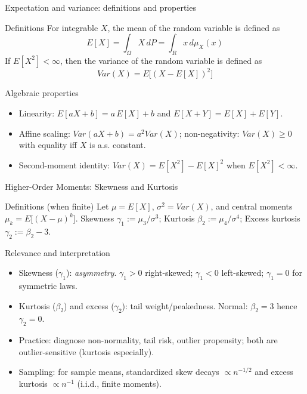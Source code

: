 \documentclass{beamer}
\def\P{P}%
\def\E{E}%
\def\Var{Var}%
\def\mathbb#1{#1}%
\newcommand{\R}{\mathbb{R}}
\renewcommand{\P}{\mathbb{P}}
\newcommand{\E}{\mathbb{E}}
\newcommand{\Var}{\operatorname{Var}}
\newcommand{\1}{\mathbf{1}}
\begin{document}
\begin{frame}{Expectation and variance: definitions and properties}
  \begin{block}{Definitions}
    For integrable $X$, the mean of the random variable is defined as
    \[ \E[X]=\int_\Omega X\,d\P=\int_{\R} x\,d\mu_X(x) \]
    If $\E[X^2]<\infty$, then the variance of the random variable is defined as
    \[ \Var(X)=\E\big[(X-\E[X])^2\big] \]
  \end{block}
  \begin{alertblock}{Algebraic properties}
    \begin{itemize}
      \item Linearity: $\E[aX+b]=a\,\E[X]+b$ and $\E[X+Y]=\E[X]+\E[Y]$.
      \item Affine scaling: $\Var(aX+b)=a^2\Var(X)$; non-negativity: $\Var(X)\ge 0$ with equality iff $X$ is a.s. constant.
      \item Second-moment identity: $\Var(X)=\E[X^2]-\E[X]^2$ when $\E[X^2]<\infty$.
    \end{itemize}
  \end{alertblock}
\end{frame}

\begin{frame}{Higher-Order Moments: Skewness and Kurtosis}{}
  {
    \begin{block}{Definitions (when finite)}
      Let $\mu=\E[X]$, $\sigma^2=\Var(X)$, and central moments $\mu_k=\E\big[(X-\mu)^k\big]$. Skewness $\gamma_1:=\mu_3/\sigma^3$; Kurtosis $\beta_2:=\mu_4/\sigma^4$; Excess kurtosis $\gamma_2:=\beta_2-3$.
    \end{block}
    \vspace{-0.4em}
    \begin{block}{Relevance and interpretation}
    \begin{itemize}\setlength{\itemsep}{0.15em}
        \item Skewness ($\gamma_1$): \emph{asymmetry}. $\gamma_1>0$ right-skewed; $\gamma_1<0$ left-skewed; $\gamma_1=0$ for symmetric laws.
        \item Kurtosis ($\beta_2$) and excess ($\gamma_2$): tail weight/peakedness. Normal: $\beta_2=3$ hence $\gamma_2=0$.
        \item Practice: diagnose non-normality, tail risk, outlier propensity; both are outlier-sensitive (kurtosis especially).
        \item Sampling: for sample means, standardized skew decays $\propto n^{-1/2}$ and excess kurtosis $\propto n^{-1}$ (i.i.d., finite moments).
      \end{itemize}
    \end{block}
  }
\end{frame}
\end{document}
